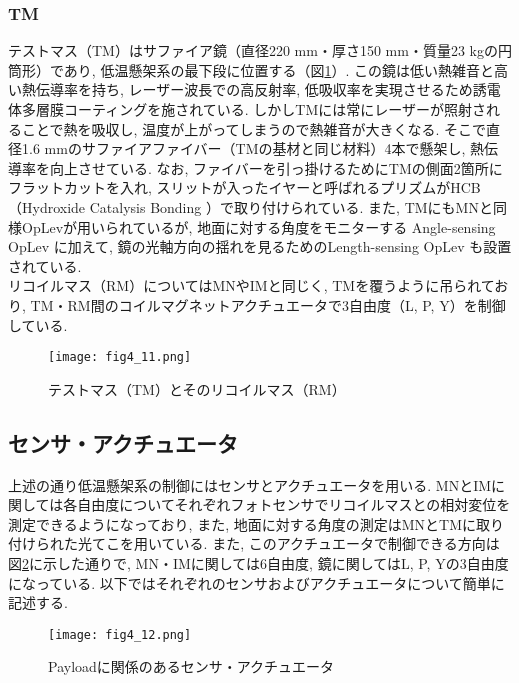 \subsubsection{TM}
\vskip3mm
テストマス（TM）はサファイア鏡（直径220 mm・厚さ150 mm・質量23 kgの円筒形）であり, 低温懸架系の最下段に位置する（図\ref{fig4.11}）. この鏡は低い熱雑音と高い熱伝導率を持ち, レーザー波長での高反射率, 低吸収率を実現させるため誘電体多層膜コーティングを施されている. しかしTMには常にレーザーが照射されることで熱を吸収し, 温度が上がってしまうので熱雑音が大きくなる. そこで直径1.6 mmのサファイアファイバー（TMの基材と同じ材料）4本で懸架し, 熱伝導率を向上させている. なお, ファイバーを引っ掛けるためにTMの側面2箇所にフラットカットを入れ, スリットが入ったイヤーと呼ばれるプリズムがHCB（Hydroxide Catalysis Bonding \cite{43}）で取り付けられている. また, TMにもMNと同様OpLevが用いられているが, 地面に対する角度をモニターする Angle-sensing OpLev に加えて, 鏡の光軸方向の揺れを見るためのLength-sensing OpLev も設置されている. \\
\quad リコイルマス（RM）についてはMNやIMと同じく, TMを覆うように吊られており, TM・RM間のコイルマグネットアクチュエータで3自由度（L, P, Y）を制御している. 
\begin{figure}[H]
\begin{center}
\texttt{[image: fig4\_11.png]} 
\caption[テストマス (TM)とそのリコイルマス (TMR)]{テストマス（TM）とそのリコイルマス（RM）}
\label{fig4.11}
\end{center}
\end{figure}
\subsection{センサ・アクチュエータ}
\label{sec4.2.2}
\vskip3mm
上述の通り低温懸架系の制御にはセンサとアクチュエータを用いる. MNとIMに関しては各自由度についてそれぞれフォトセンサでリコイルマスとの相対変位を測定できるようになっており, また, 地面に対する角度の測定はMNとTMに取り付けられた光てこを用いている. また, このアクチュエータで制御できる方向は図\ref{fig4.12}に示した通りで, MN・IMに関しては6自由度, 鏡に関してはL, P, Yの3自由度になっている. 以下ではそれぞれのセンサおよびアクチュエータについて簡単に記述する. 
\begin{figure}[H]
\begin{center}
\texttt{[image: fig4\_12.png]} 
\caption[Payloadに関係のあるセンサ・アクチュエータ]{Payloadに関係のあるセンサ・アクチュエータ}
\label{fig4.12}
\end{center}
\end{figure}
